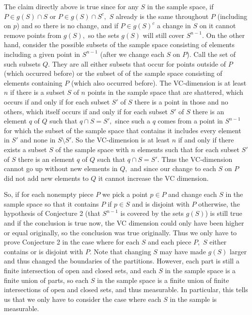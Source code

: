 \documentclass[12pt]{amsart}
\newcommand{\0}{\mat{0}}
\newcommand{\1}{\mathds{1}}
\begin{document}
The claim directly above is true since for any $S$ in the sample space, if $P \in g(S) \cap S$ or $P \in g(S) \cap S^c,$ $S$ already is the same throughout $P$ (including on $p$) and so there is no change, and if $P \in g(S)^c$ a change in $S$ on it cannot remove points from $g(S),$ so the sets $g(S)$ will still cover $S^{n - 1}.$ On the other hand, consider the possible subsets of the sample space consisting of elements including a given point in $S^{n - 1}$ (after we change each $S$ on $P$). Call the set of such subsets $Q.$ They are all either subsets that occur for points outside of $P$ (which occurred before) or the subset of of the sample space consisting of elements containing $P$ (which also occurred before). The VC-dimension is at least $n$ if there is a subset $S$ of $n$ points in the sample space that are shattered, which occurs if and only if for each subset $S'$ of $S$ there is a point in those and no others, which itself occurs if and only if for each subset $S'$ of $S$ there is an element $q$ of $Q$ such that $q \cap S = S',$ since such a $q$ comes from a point in $S^{n - 1}$ for which the subset of the sample space that contains it includes every element in $S'$ and none in $S \setminus S'.$ So the VC-dimension is at least $n$ if and only if there exists a subset $S$ of the sample space with $n$ elements such that for each subset $S'$ of $S$ there is an element $q$ of $Q$ such that $q \cap S = S'.$ Thus the VC-dimension cannot go up without new elements in $Q,$ and since our change to each $S$ on $P$ did not add new elements to $Q$ it cannot increase the VC dimension.

So, if for each nonempty piece $P$ we pick a point $p \in P$ and change each $S$ in the sample space so that it contains $P$ if $p \in S$ and is disjoint with $P$ otherwise, the hypothesis of Conjecture 2 (that $S^{n - 1}$ is covered by the sets $g(S)$) is still true and if the conclusion is true now, the VC dimension could only have been higher or equal originally, so the conclusion was true originally. Thus we only have to prove Conjecture 2 in the case where for each $S$ and each piece $P,$ $S$ either contains or is disjoint with $P.$ Note that changing $S$ may have made $g(S)$ larger and thus changed the boundaries of the partitions. However, each part is still a finite intersection of open and closed sets, and each $S$ in the sample space is a finite union of parts, so each $S$ in the sample space is a finite union of finite intersections of open and closed sets, and thus measurable. In particular, this tells us that we only have to consider the case where each $S$ in the sample is measurable.
\end{document}
